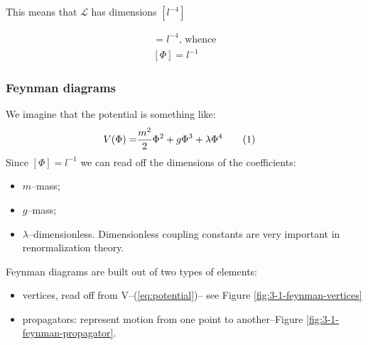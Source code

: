 \documentclass[]{article}
\newcommand\numberthis{\addtocounter{equation}{1}\tag{\theequation}}
\begin{document}
This means that $\mathcal{L}$ has dimensions $[l^{-4}]$

\begin{align*}
	[(\frac{\partial \Phi}{\partial x})^2]=l^{-4} \text{, whence}\\
	[\Phi] = l^{-1}
\end{align*}

\subsubsection{Feynman diagrams}

We imagine that the potential is something like:
\begin{align*}
	V(\Phi) =& \frac{m^2}{2} \Phi^2 + g \Phi^3 + \lambda \Phi^4 \numberthis \label{eq:potential}
\end{align*}
Since $[\Phi] = l^{-1}$ we can read off the dimensions of the coefficients:
\begin{itemize}
	\item $m$--mass;
	\item $g$--mass;
	\item $\lambda$--dimensionless. Dimensionless coupling constants are very important in renormalization theory.
\end{itemize}

Feynman diagrams are built out of two types of elements:
\begin{itemize}
	\item vertices, read off from V--(\ref{eq:potential})-- see Figure \ref{fig:3-1-feynman-vertices}
	\item propagators: represent motion from one point to another--Figure \ref{fig:3-1-feynman-propagator}.
\end{itemize}
\end{document}
